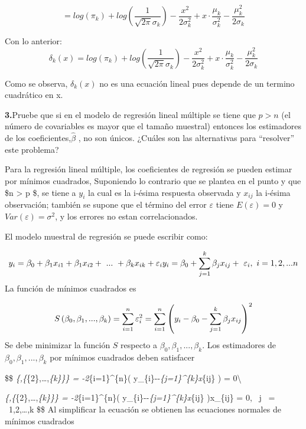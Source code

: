 \documentclass[
]{article}
\begin{document}
\[
= log(\pi_k) + log(\frac{1}{\sqrt{2\pi}\sigma_k}) -  \frac{x^2}{2\sigma_k^2} + x \cdot \frac{\mu_k}{\sigma_k^2}  - \frac{\mu_k^2}{2\sigma_k} 
\]

Con lo anterior: \[
\delta_k(x)
= log(\pi_k) + log(\frac{1}{\sqrt{2\pi}\sigma_k}) -  \frac{x^2}{2\sigma_k^2} + x \cdot \frac{\mu_k}{\sigma_k^2}  - \frac{\mu_k^2}{2\sigma_k} 
\]

Como se observa, \(\delta_k(x)\) no es una ecuación lineal pues depende
de un termino cuadrático en x.

\textbf{3.}Pruebe que si en el modelo de regresión lineal múltiple se
tiene que \(p > n\) (el número de covariables es mayor que el tamaño
muestral) entonces los estimadores de los
coeficientes,\(\widehat{\beta }\) , no son únicos. ¿Cuáles son las
alternativas para ``resolver'' este problema?

Para la regresión lineal múltiple, los coeficientes de regresión se
pueden estimar por mínimos cuadrados, Suponiendo lo contrario que se
plantea en el punto y que \$n \textgreater{} p \$, se tiene a \(y_{i}\)
la cual es la i-ésima respuesta observada y \(x_{ij}\) la i-ésima
observación; también se supone que el término del error \(\varepsilon\)
tiene \(E\left ( \varepsilon \right ) = 0\) y
\(Var\left ( \varepsilon \right ) = \sigma ^{2}\), y los errores no
estan correlacionados.

El modelo muestral de regresión se puede escribir como:

\[
y_{i}=\beta _{0}+\beta _{1}x_{i1}+\beta _{1}x_{i2}+\ ...\ +\beta _{k}x_{ik} +\varepsilon _{i}\\
y_{i}=\beta _{0}+\sum_{j=1}^{k}\beta _{j}x_{ij} +\ \varepsilon _{i},  \ i=1,2,...n
\] La función de mínimos cuadrados es

\[
S\left ( \beta _{0},\beta _{1}, ..., \beta _{k} \right ) = \sum_{i = 1}^{n}\varepsilon _{i}^{2}\\
 = \sum_{i = 1}^{n}\left ( y_{i}-\beta _{0}-\sum_{j=1}^{k}\beta _{j}x_{ij} \right )^{2}
\] Se debe minimizar la función \(S\) respecto a
\(\beta _{0},\beta _{1}, ..., \beta _{k}\). Los estimadores de
\(\beta _{0},\beta _{1}, ..., \beta _{k}\) por mínimos cuadrados deben
satisfacer

\$\$
\mid \emph{\{,\{\widehat\beta }\{2\},\ldots,\widehat\beta \emph{\{k\}\}\}
= -2\sum}\{i=1\}\^{}\{n\}\left (
y\_\{i\}--\sum\emph{\{j=1\}\^{}\{k\}x}\{ij\}
\right ) = 0\textbackslash{}

\mid \emph{\{,\{\widehat\beta }\{2\},\ldots,\widehat\beta \emph{\{k\}\}\}
= -2\sum}\{i=1\}\^{}\{n\}\left (
y\_\{i\}--\sum\emph{\{j=1\}\^{}\{k\}x}\{ij\}
\right )x\_\{ij\} = 0, ~j ~= ~1,2,\ldots,k \$\$ Al simplificar la
ecuación se obtienen las ecuaciones normales de mínimos cuadrados
\end{document}
